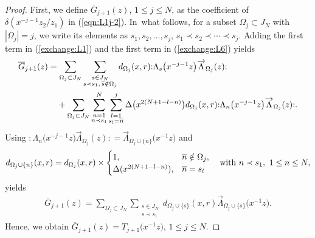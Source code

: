 \documentclass[pdftex]{sigma}
\numberwithin{equation}{section}
\begin{document}
\begin{proof}
First, we define $\overline{G}_{j+1}(z)$, $1\leq j \leq N$,
as the coefficient of
$\delta(x^{-j-1}z_2/z_1)$ in (\ref{eqn:L1j-2}).
In~what follows, for a subset $\Omega_j \subset J_N$ with $|\Omega_j|=j$,
we write its elements as $s_1, s_2, \dots, s_j$, $s_1\prec s_2 \prec \cdots \prec s_j$.
Adding the first term in (\ref{exchange:L1}) and the first term in (\ref{exchange:L6}) yields
\begin{align*}
\begin{split}
&\overline{G}_{j+1}(z)
=\sum_{\Omega_j \subset J_N}
\sum\limits_{\substack{s \in J_N\\s \prec s_1, \,\overline{s} \notin \Omega_j}}
d_{\Omega_{j}}(x,r){:}\Lambda_{s}\big(x^{-j-1}z\big)\overrightarrow{\Lambda}_{{\Omega_{j}}}(z){:}\notag
\\
&\hphantom{\overline{G}_{j+1}(z)=}
+\sum_{\Omega_j \subset J_N}\sum\limits_{\substack{n=1\\n \prec s_1}}^N
\sum\limits_{\substack{l=1\\s_l=\overline{n}}}^j\Delta\big(x^{2(N+1-l-n)}\big) d_{{\Omega_{j}}}(x,r)
{:}\Lambda_{n}\big(x^{-j-1}z\big)\overrightarrow{\Lambda}_{{\Omega_{j}}}(z){:}.
\end{split}
\end{align*}
Using
${:}\Lambda_{n}\big(x^{-j-1}z\big)\overrightarrow{\Lambda}_{{\Omega_{j}}}(z){:}
=\overrightarrow{\Lambda}_{{\Omega_{j}\cup \{n\}}}\big(x^{-1}z\big)$
and
\begin{gather*}
d_{{\Omega_{j}\cup \{n\}}}(x,r)=
d_{{\Omega_{j}}}(x,r)\times
\begin{cases}
1,& \overline{n} \notin \Omega_j,
\\
\Delta(x^{{2(N+1-l-n)}}),&\overline{n}=s_l
\end{cases}\quad
{\rm with}\ n \prec s_1,\ 1\leq n \leq N,
\end{gather*}
yields
\begin{gather*}
\overline{G}_{j+1}(z)=
\sum_{\Omega_j \subset J_N}\sum\limits_{\substack{s \in J_N
\\s\prec s_1}}d_{\Omega_j\cup \{s\}}(x,r)
\overrightarrow{\Lambda}_{\Omega_j \cup \{s\}}\big(x^{-1}z\big) .
\end{gather*}
Hence, we obtain ${\overline{G}_{j+1}(z)}=T_{j+1}\big(x^{-1}z\big)$, $1\leq j \leq N$.


\end{proof}
\end{document}

